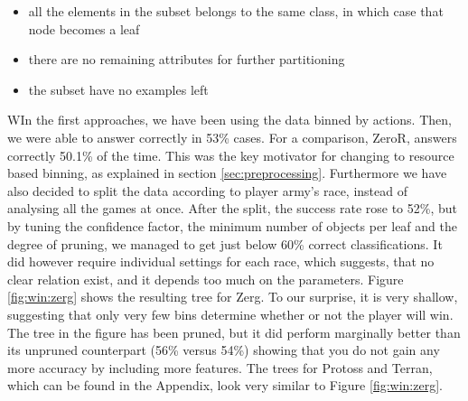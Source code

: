 \documentclass[a4paper,11pt]{article}
\begin{document}
\begin{itemize}
\item all the elements in the subset belongs to the same class, in which case that node becomes a leaf
\item there are no remaining attributes for further partitioning
\item the subset have no examples left
\end{itemize}

WIn the first approaches, we have been using the data binned by actions. Then, we were able to answer correctly in 53\% cases. For a comparison, ZeroR, answers correctly 50.1\% of the time. This was the key motivator for changing to resource based binning, as explained in section \ref{sec:preprocessing}. Furthermore we have also decided to split the data according to player army’s race, instead of analysing all the games at once. After the split, the success rate rose to 52\%, but by tuning the confidence factor, the minimum number of objects per leaf and the degree of pruning, we managed to get just below 60\% correct classifications. It did however require individual settings for each race, which suggests, that no clear relation exist, and it depends too much on the parameters. Figure \ref{fig:win:zerg} shows the resulting tree for Zerg. To our surprise, it is very shallow, suggesting that only very few bins determine whether or not the player will win. The tree in the figure has been pruned, but it did perform marginally better than its unpruned counterpart (56\% versus 54\%) showing that you do not gain any more accuracy by including more features. The trees for Protoss and Terran, which can be found in the Appendix, look very similar to Figure \ref{fig:win:zerg}. 
\end{document}
